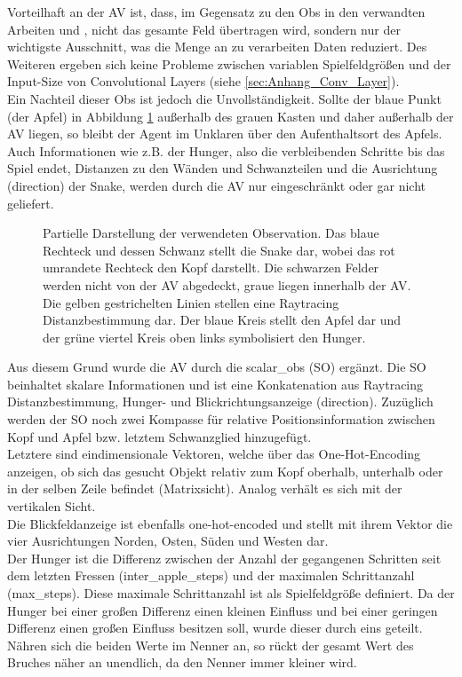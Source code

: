 Vorteilhaft an der AV ist, dass, im Gegensatz zu den Obs in den verwandten Arbeiten \cite{Autonomous_Agents_in_Snake_Game_via_DRL} und \cite{UAV}, nicht das gesamte Feld übertragen wird, sondern nur der wichtigste Ausschnitt, was die Menge an zu verarbeiten Daten reduziert. Des Weiteren ergeben sich keine Probleme zwischen variablen Spielfeldgrößen und der Input-Size von Convolutional Layers (siehe \ref{sec:Anhang_Conv_Layer}).\\
Ein Nachteil dieser Obs ist jedoch die Unvollständigkeit. Sollte der blaue Punkt (der Apfel) in Abbildung \ref{fig:Observation} außerhalb des grauen Kasten und daher außerhalb der AV liegen, so bleibt der Agent im Unklaren über den Aufenthaltsort des Apfels.
Auch Informationen wie z.B. der Hunger, also die verbleibenden Schritte bis das Spiel endet, Distanzen zu den Wänden und Schwanzteilen und die Ausrichtung (direction) der Snake, werden durch die AV nur eingeschränkt oder gar nicht geliefert.
\begin{figure}[H]
	\centering
	\def\svgscale{0.80}
	
	\caption[Observation]{Partielle Darstellung der verwendeten Observation. Das blaue Rechteck und dessen Schwanz stellt die Snake dar, wobei das rot umrandete Rechteck den Kopf darstellt. Die schwarzen Felder werden nicht von der AV abgedeckt, graue liegen innerhalb der AV. 
		Die gelben gestrichelten Linien stellen eine Raytracing Distanzbestimmung dar. Der blaue Kreis stellt den Apfel dar und der grüne viertel Kreis oben links symbolisiert den Hunger.}
	\label{fig:Observation}
\end{figure}
Aus diesem Grund wurde die AV durch die scalar\_obs (SO) ergänzt.
Die SO beinhaltet skalare Informationen und ist eine Konkatenation aus Raytracing Distanzbestimmung, Hunger- und Blickrichtungsanzeige (direction). Zuzüglich werden der SO noch zwei Kompasse für relative Positionsinformation zwischen Kopf und Apfel bzw. letztem Schwanzglied hinzugefügt.\\
Letztere sind eindimensionale Vektoren, welche über das One-Hot-Encoding anzeigen, ob sich das gesucht Objekt relativ zum Kopf oberhalb, unterhalb oder in der selben Zeile befindet (Matrixsicht). Analog verhält es sich mit der vertikalen Sicht.\\
Die Blickfeldanzeige ist ebenfalls one-hot-encoded und stellt mit ihrem Vektor die vier Ausrichtungen Norden, Osten, Süden und Westen dar.\\
Der Hunger ist die Differenz zwischen der Anzahl der gegangenen Schritten seit dem letzten Fressen (inter\_apple\_steps) und der maximalen Schrittanzahl (max\_steps). Diese maximale Schrittanzahl ist als Spielfeldgröße definiert. Da der Hunger bei einer großen Differenz einen kleinen Einfluss und bei einer geringen Differenz einen großen Einfluss besitzen soll, wurde dieser durch eins geteilt. Nähren sich die beiden Werte im Nenner an, so rückt der gesamt Wert des Bruches näher an unendlich, da den Nenner immer kleiner wird.
